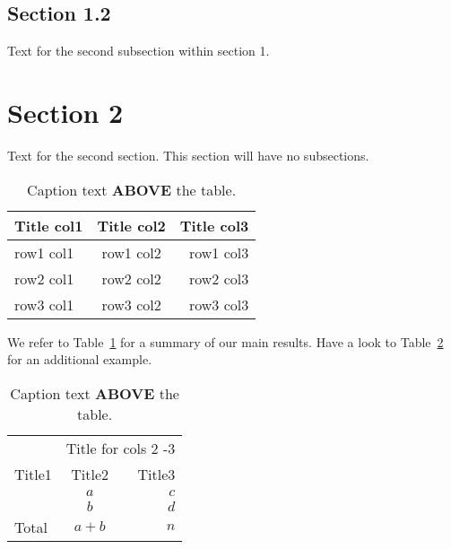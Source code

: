 \documentclass[twoside]{report}
\begin{document}
\subsection{Section 1.2}
Text for the second subsection within section 1.
\section{Section 2}
Text for the second section. This section will have no subsections.





\begin{table}[!ht]\centering
\caption{\label{smith:tab1} Caption text \textbf{ABOVE} the table.}
\medskip
\begin{tabular}{lcr}
\toprule[0.09 em]
Title col1 & Title col2 & Title col3 \\
\midrule
row1 col1  & row1 col2  & row1 col3  \\
row2 col1  & row2 col2  & row2 col3  \\ %
row3 col1  & row3 col2  & row3 col3  \\
\bottomrule[0.09 em]
\end{tabular}
\end{table}

We refer to Table~\ref{smith:tab1} for a summary of our main results. Have a look to Table~\ref{smith:tab2} for
an additional example.

\begin{table}[!ht]\centering
\caption{\label{smith:tab2} Caption text \textbf{ABOVE} the table.}
\medskip
\begin{tabular}{lcr}
\toprule[0.09 em]
  &\multicolumn{2}{c}{Title  for cols 2 -3} \\
\cmidrule{2-3} %
Title1 & Title2 & Title3 \\
\midrule
& $a$  & $c$ \\
& $b$  & $d$ \\ %
\midrule[0 em]
Total  & $a+b$  & $n$  \\
\bottomrule[0.09 em]
\end{tabular}
\end{table}
\end{document}
